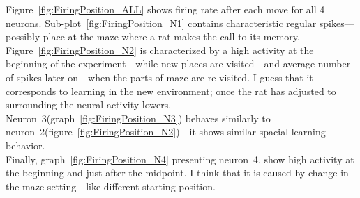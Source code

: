 \documentclass[12pt,a4paper,twocolumn]{article}
\begin{document}
Figure~\ref{fig:FiringPosition_ALL} shows firing rate after each move for all 4 neurons. Sub-plot~\ref{fig:FiringPosition_N1} contains characteristic regular spikes---possibly place at the maze where a rat makes the call to its memory.\\
Figure~\ref{fig:FiringPosition_N2} is characterized by a high activity at the beginning of the experiment---while new places are visited---and average number of spikes later on---when the parts of maze are re-visited. I guess that it corresponds to learning in the new environment; once the rat has adjusted to surrounding the neural activity lowers.\\
Neuron~3(graph~\ref{fig:FiringPosition_N3}) behaves similarly to neuron~2(figure~\ref{fig:FiringPosition_N2})---it shows similar spacial learning behavior.\\
Finally, graph~\ref{fig:FiringPosition_N4} presenting neuron~4, show high activity at the beginning and just after the midpoint. I think that it is caused by change in the maze setting---like different starting position.\\
\end{document}
